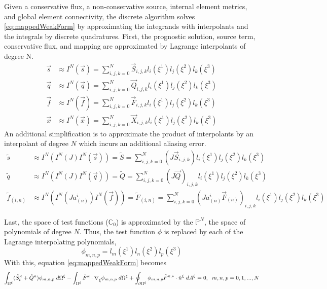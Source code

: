 \documentclass{softwaremanual}
\begin{document}
 Given a conservative flux, a non-conservative source, internal element metrics, and global element connectivity, the discrete algorithm solves \eqref{eq:mappedWeakForm} by approximating the integrands with interpolants and the integrals by discrete quadratures. First, the prognostic solution, source term, conservative flux, and mapping are approximated by Lagrange interpolants of degree N.
 \begin{subequations}
    \begin{align}
    \vec{s} &\approx I^N(\vec{s}) = \sum_{i,j,k=0}^N \vec{S}_{i,j,k} l_i(\xi^1) l_j(\xi^2) l_k(\xi^3) \\
    \vec{q} &\approx I^N(\vec{q}) = \sum_{i,j,k=0}^N \vec{Q}_{i,j,k} l_i(\xi^1) l_j(\xi^2) l_k(\xi^3) \\
    \vec{f} &\approx I^N(\vec{f}) = \sum_{i,j,k=0}^N \vec{F}_{i,j,k} l_i(\xi^1) l_j(\xi^2) l_k(\xi^3) \\
    \vec{x} &\approx I^N( \vec{x} ) = \sum_{i,j,k=0}^N \vec{X}_{i,j,k} l_i(\xi^1) l_j(\xi^2) l_k(\xi^3)
    \end{align}
 \end{subequations}
An additional simplification is to approximate the product of interpolants by an interpolant of degree $N$ which incurs an additional aliasing error.
\begin{subequations}
    \begin{align}
    \tilde{s} &\approx I^N(I^N(J) I^N(\vec{s})) = \tilde{S} =  \sum_{i,j,k=0}^N (J \vec{S}_{i,j,k}) l_i(\xi^1) l_j(\xi^2) l_k(\xi^3) \\
    \tilde{q} &\approx I^N(I^N(J) I^N(\vec{q}))= \tilde{Q} = \sum_{i,j,k=0}^N (J \vec{Q})_{i,j,k} l_i(\xi^1) l_j(\xi^2) l_k(\xi^3) \\
    \tilde{f}_{(i,n)} &\approx I^N(I^N(Ja^i_{(n)})I^N(\vec{f}) ) =\tilde{F}_{(i,n)}= \sum_{i,j,k=0}^N (Ja^i_{(n)}\vec{F}_{(n)})_{i,j,k} l_i(\xi^1) l_j(\xi^2) l_k(\xi^3) 
    \end{align}
 \end{subequations}
 
Last, the space of test functions ($\mathbb{C}_0$) is approximated by the $\mathbb{P}^N$, the space of polynomials of degree $N$. Thus, the test function $\phi$ is replaced by each of the Lagrange interpolating polynomials, 
 \begin{equation}
 \phi_{m,n,p} = l_m(\xi^1) l_n(\xi^2) l_p(\xi^3)
 \end{equation}
 With this, equation \eqref{eq:mappedWeakForm} becomes
   \begin{equation}
  \int_{\Omega^\xi} (\tilde{S}^\kappa_t + \tilde{Q}^\kappa) \phi_{m,n,p}  \hspace{1mm} d\Omega^\xi  - \int_{\Omega^\xi} \tilde{F}^\kappa \cdot \nabla_{\vec{\xi}} \phi_{m,n,p}   \hspace{1mm} d\Omega^\xi + \oint_{\partial \Omega^\xi} \phi_{m,n,p}  \tilde{F}^{\kappa,*}  \cdot \hat{n}^\xi \hspace{1mm} d A^\xi = 0, \hspace{2mm} m,n,p=0,1,...,N  \label{eq:approx_mappedWeakForm}
  \end{equation}
  
\end{document}
